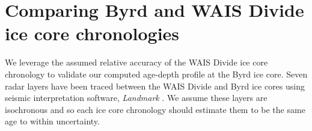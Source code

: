 \section{Comparing Byrd and WAIS Divide ice core chronologies}\label{byrdwdcompare}
We leverage the assumed relative accuracy of the WAIS Divide ice core chronology to validate our computed age-depth profile at the Byrd ice core. Seven radar layers have been traced between the WAIS Divide and Byrd ice cores using seismic interpretation software, \textit{Landmark} \citep{}. We assume these layers are isochronous \citep{} and so each ice core chronology should estimate them to be the same age to within uncertainty. 







